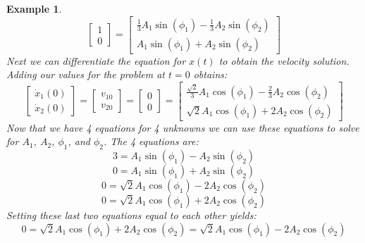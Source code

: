 \documentclass[12pt,letter]{article}
\newtheorem{ex}{Example}
\numberwithin{ex}{section} %
\newenvironment{example}{\begin{mdframed}[middlelinewidth=0.5mm]\begin{ex}\normalfont}{\end{ex}\end{mdframed}}
\numberwithin{re}{section} %
\begin{document}
\begin{example}
\begin{equation}
	 \begin{bmatrix} 1 \\  0 \end{bmatrix} =  \begin{bmatrix} \frac{1}{3}A_1 \sin (\phi_1 ) -\frac{1}{3}A_2 \sin (\phi_2)\\ A_1 \sin (\phi_1 )+A_2 \sin (\phi_2 )\end{bmatrix}
\end{equation}
Next we can differentiate the equation for $x(t)$ to obtain the velocity solution. Adding our values for the problem at $t=0$ obtains:
\begin{equation}
	 \begin{bmatrix} \dot{x}_1(0) \\  \dot{x}_2(0) \end{bmatrix}  = \begin{bmatrix} v_{10} \\  v_{20} \end{bmatrix} = \begin{bmatrix} 0 \\  0 \end{bmatrix} =   \begin{bmatrix} \frac{\sqrt{2}}{3}A_1 \cos (\phi_1 ) -\frac{2}{3}A_2 \cos (\phi_2)\\ \sqrt{2}A_1 \cos (\phi_1 )+2 A_2 \cos (\phi_2 )\end{bmatrix}
\end{equation}
Now that we have 4 equations for 4 unknowns we can use these equations to solve for $A_1$,  $A_2$, $\phi_1$,  and $\phi_2$. The 4 equations are:
\begin{equation}
3= A_1 \sin (\phi_1 ) - A_2 \sin (\phi_2)
\end{equation}
\begin{equation}
0= A_1 \sin (\phi_1 ) + A_2 \sin (\phi_2)
\end{equation}
\begin{equation}
0= \sqrt{2}A_1 \cos (\phi_1 ) - 2A_2 \cos (\phi_2)
\end{equation}
\begin{equation}
0= \sqrt{2}A_1 \cos (\phi_1 ) + 2A_2 \cos (\phi_2)
\end{equation}
Setting these last two equations equal to each other yields:
\begin{equation}
0= \sqrt{2}A_1 \cos (\phi_1 ) + 2A_2 \cos (\phi_2) = \sqrt{2}A_1 \cos (\phi_1 ) - 2A_2 \cos (\phi_2)
\end{equation}

\end{example}
\end{document}
